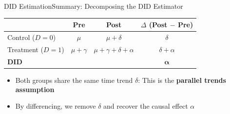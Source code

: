 \documentclass[dvipsnames,hyperref={pdfpagelabels=false}]{beamer}
\begin{document}


\begin{frame}{DID Estimation}{Summary: Decomposing the DID Estimator}

\begin{center}
\begin{threeparttable}
\begin{tabular}{lccc}
\toprule
                     & Pre                 & Post                             & $\Delta$ (Post $-$ Pre) \\
\midrule
Control ($D=0$)      & $\mu$               & $\mu + \delta$                   & $\delta$                \\[4pt]
Treatment ($D=1$)    & $\mu + \gamma$      & $\mu + \gamma + \delta + \alpha$ & $\delta + \alpha$       \\[4pt]
\midrule
\textbf{DID}         &                     &                                  & $\boldsymbol{\alpha}$   \\
\bottomrule
\end{tabular}
\end{threeparttable}
\end{center}

\begin{itemize}
    \item Both groups share the same time trend $\delta$:  This is the \textbf{parallel trends assumption}
    \vspace{0.2cm}
    \item By differencing, we remove $\delta$ and recover the causal effect $\alpha$
\end{itemize}

\end{frame}







\end{document}
